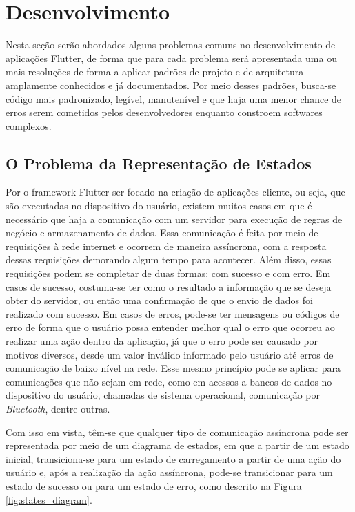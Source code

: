 \documentclass[12pt, %
openright, 
oneside, %
a4paper,    %
brazil]{facom-ufu-abntex2}
\begin{document}
\chapter{Desenvolvimento} \label{chapt:development}
Nesta seção serão abordados alguns problemas comuns no desenvolvimento de aplicações Flutter, de forma que para cada problema será apresentada uma ou mais resoluções de forma a aplicar padrões de projeto e de arquitetura amplamente conhecidos e já documentados. Por meio desses padrões, busca-se código mais padronizado, legível, manutenível e que haja uma menor chance de erros serem cometidos pelos desenvolvedores enquanto constroem softwares complexos.

\section{O Problema da Representação de Estados} \label{sec:state_representation}
Por o framework Flutter ser focado na criação de aplicações cliente, ou seja, que são executadas no dispositivo do usuário, existem muitos casos em que é necessário que haja a comunicação com um servidor para execução de regras de negócio e armazenamento de dados. Essa comunicação é feita por meio de requisições à rede internet e ocorrem de maneira assíncrona, com a resposta dessas requisições demorando algum tempo para acontecer. Além disso, essas requisições podem se completar de duas formas: com sucesso e com erro. Em casos de sucesso, costuma-se ter como o resultado a informação que se deseja obter do servidor, ou então uma confirmação de que o envio de dados foi realizado com sucesso. Em casos de erros, pode-se ter mensagens ou códigos de erro de forma que o usuário possa entender melhor qual o erro que ocorreu ao realizar uma ação dentro da aplicação, já que o erro pode ser causado por motivos diversos, desde um valor inválido informado pelo usuário até erros de comunicação de baixo nível na rede. Esse mesmo princípio pode se aplicar para comunicações que não sejam em rede, como em acessos a bancos de dados no dispositivo do usuário, chamadas de sistema operacional, comunicação por \textit{Bluetooth}, dentre outras.

Com isso em vista, têm-se que qualquer tipo de comunicação assíncrona pode ser representada por meio de um diagrama de estados, em que a partir de um estado inicial, transiciona-se para um estado de carregamento a partir de uma ação do usuário e, após a realização da ação assíncrona, pode-se transicionar para um estado de sucesso ou para um estado de erro, como descrito na Figura \ref{fig:states_diagram}.
\end{document}
